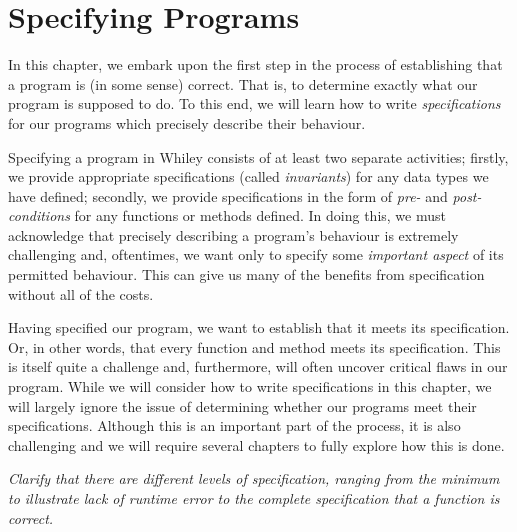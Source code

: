 \chapter{Specifying Programs}
In this chapter, we embark upon the first step in the process of establishing that a program is (in some sense) correct.  That is, to determine exactly what our program is supposed to do.  To this end, we will learn how to write {\em specifications} for our programs which precisely describe their behaviour.  


Specifying a program in Whiley consists of at least two separate activities;  firstly, we provide appropriate specifications (called
{\em invariants}) for any data types we have defined;  secondly, we provide specifications in the form of {\em pre-} and {\em post-conditions} for any functions or methods defined.  In doing this, we must acknowledge that precisely describing a program's behaviour is extremely challenging and, oftentimes, we want only to specify some {\em important aspect} of its permitted behaviour.  This can give us many of the benefits from specification without all of the costs.  

Having specified our program, we want to establish that it meets its specification.  Or, in other words, that every function and method meets its specification.  This is itself quite a challenge and, furthermore, will often uncover critical flaws in our program.  While we will consider how to write specifications in this chapter, we will largely ignore the issue of determining whether our programs meet their specifications.  Although this is an important part of the process, it is also challenging and we will require several chapters to fully explore how this is done.

{\em Clarify that there are different levels of specification, ranging from the minimum to illustrate lack of runtime error to the complete specification that a function is correct.}

